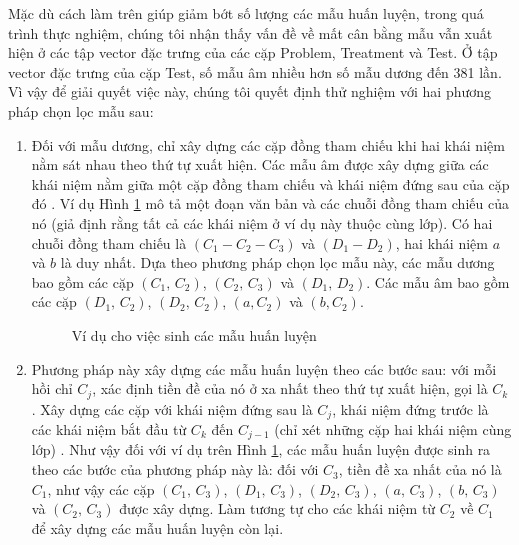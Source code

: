 Mặc dù cách làm trên giúp giảm bớt số lượng các mẫu huấn luyện, trong quá trình thực nghiệm, chúng tôi nhận thấy vấn đề về mất cân bằng mẫu vẫn xuất hiện ở các tập vector đặc trưng của các cặp Problem, Treatment và Test. Ở tập vector đặc trưng của cặp Test, số mẫu âm nhiều hơn số mẫu dương đến 381 lần. Vì vậy để giải quyết việc này, chúng tôi quyết định thử nghiệm với hai phương pháp chọn lọc mẫu sau:
\begin{enumerate}
\item Đối với mẫu dương, chỉ xây dựng các cặp đồng tham chiếu khi hai khái niệm nằm sát nhau theo thứ tự xuất hiện. Các mẫu âm được xây dựng giữa các khái niệm nằm giữa một cặp đồng tham chiếu và khái niệm đứng sau của cặp đó \cite{Soon2001}. Ví dụ Hình \ref{fig:insgen-eg} mô tả một đoạn văn bản và các chuỗi đồng tham chiếu của nó (giả định rằng tất cả các khái niệm ở ví dụ này thuộc cùng lớp). Có hai chuỗi đồng tham chiếu là $(C_1-C_2-C_3)$ và $(D_1-D_2)$, hai khái niệm $a$ và $b$ là duy nhất. Dựa theo phương pháp chọn lọc mẫu này, các mẫu dương bao gồm các cặp $(C_1,\,C_2)$, $(C_2,\,C_3)$ và $(D_1,\,D_2)$. Các mẫu âm bao gồm các cặp $(D_1,\,C_2)$, $(D_2,\,C_2)$, $(a,C_2)$ và $(b,C_2)$.

\begin{figure}[ht]
\centering
{}
\caption{Ví dụ cho việc sinh các mẫu huấn luyện\label{fig:insgen-eg}}
\end{figure}

\item Phương pháp này xây dựng các mẫu huấn luyện theo các bước sau: với mỗi hồi chỉ $C_j$, xác định tiền đề của nó ở xa nhất theo thứ tự xuất hiện, gọi là $C_k$. Xây dựng các cặp với khái niệm đứng sau là $C_j$, khái niệm đứng trước là các khái niệm bắt đầu từ $C_k$ đến $C_{j-1}$ (chỉ xét những cặp hai khái niệm cùng lớp) \cite{VincentNg2002b}. Như vậy đối với ví dụ trên Hình \ref{fig:insgen-eg}, các mẫu  huấn luyện được sinh ra theo các bước của phương pháp này là: đối với $C_3$, tiền đề xa nhất của nó là $C_1$, như vậy các cặp $(C_1,\,C_3)$, $(D_1,\,C_3)$, $(D_2,\,C_3)$, $(a,\,C_3)$, $(b,\,C_3)$ và $(C_2,\,C_3)$ được xây dựng. Làm tương tự cho các khái niệm từ $C_2$ về $C_1$ để xây dựng các mẫu huấn luyện còn lại.
\end{enumerate}

